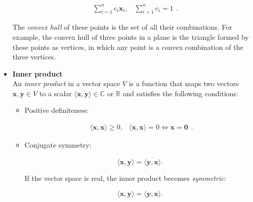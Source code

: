 \documentclass[10pt,b5paper,titlepage]{book}
\begin{document}
\begin{itemize}
         \begin{equation}
             \begin{array}{lr}
                 \sum_{i=1}^{n} c_{i} \mathbf{x}_{i}, & \sum_{i=1}^{n} c_{i} = 1
             \end{array}
         .\end{equation}

         The \textit{convex hull} of these points is the set of all their combinations.
         For example, the convex hull of three points in a plane is the triangle
         formed by these points as vertices, in which any point is a convex
         combination of the three vertices.

     \item \textbf{Inner product}\\

         An \textit{inner product} in a vector space $V$ is a function that maps
         two vectors $\mathbf{x}, \mathbf{y} \in V$ to a scalar
         $\langle \mathbf{x}, \mathbf{y} \rangle \in \mathbb{C}$ or $\mathbb{R}$
         and satisfies the following conditions:

         \begin{itemize}
             \item Positive definiteness:

                 \begin{equation}
                     \begin{array}{lr}
                         \langle \mathbf{x}, \mathbf{x} \rangle \ge 0, &
                         \langle \mathbf{x}, \mathbf{x} \rangle = 0 \iff \mathbf{x} = \mathbf{0}
                     \end{array}
                 .\end{equation}

             \item Conjugate symmetry:

                 \begin{equation}
                     \langle \mathbf{x}, \mathbf{y} \rangle
                     = \overline{\langle \mathbf{y}, \mathbf{x} \rangle}
                 .\end{equation}

                 If the vector space is real, the inner product becomes \textit{symmetric}:

                 \begin{equation}
                     \langle \mathbf{x}, \mathbf{y} \rangle
                     = \langle \mathbf{y}, \mathbf{x} \rangle
                 .\end{equation}


\end{itemize}
\end{itemize}
\end{document}
